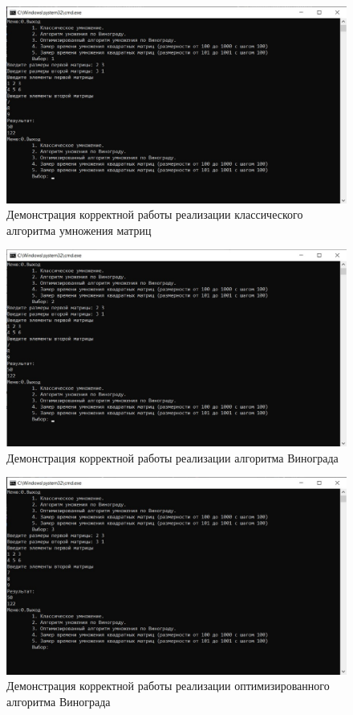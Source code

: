 \begin{figure}[H]
	\centering
	\includegraphics[width=1\linewidth]{inc/img/democl}
	\caption{Демонстрация корректной работы реализации классического алгоритма умножения матриц}
	\label{fig:democl}
\end{figure}
\begin{figure}[H]
	\centering
	\includegraphics[width=1\linewidth]{inc/img/demov}
	\caption{Демонстрация корректной работы реализации алгоритма Винограда}
	\label{fig:demov}
\end{figure}

\begin{figure}[H]
	\centering
	\includegraphics[width=1\linewidth]{inc/img/demo}
	\caption{Демонстрация корректной работы реализации оптимизированного алгоритма Винограда}
	\label{fig:demo}
\end{figure}



